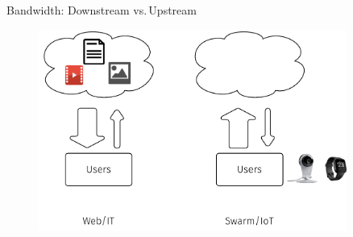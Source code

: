 \begin{frame}{Bandwidth: Downstream vs.\,Upstream}
  \vspace{1em}
  \begin{figure}
    \includegraphics[width=0.9\textwidth]{figures/uplink-downlink.pdf}
  \end{figure}
\end{frame}

